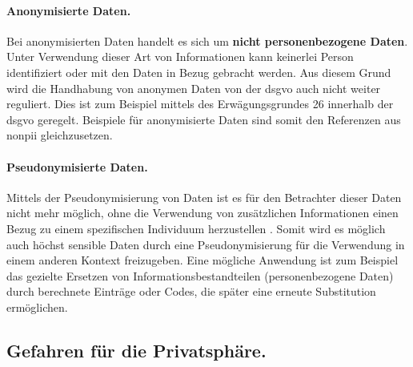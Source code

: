 \paragraph{Anonymisierte Daten.}
\label{sec:Grundlagen:para:Anonymisierte Daten}
Bei anonymisierten Daten handelt es sich um \textbf{nicht personenbezogene Daten}. Unter Verwendung dieser Art von Informationen kann keinerlei Person identifiziert oder mit den Daten in Bezug gebracht werden. Aus diesem Grund wird die Handhabung von anonymen Daten von der \ac{dsgvo} auch nicht weiter reguliert. Dies ist zum Beispiel mittels des Erwägungsgrundes 26 \cite{DSGVOEg26} innerhalb der \ac{dsgvo} geregelt. Beispiele für anonymisierte Daten sind somit den Referenzen aus \ac{nonpii} gleichzusetzen.


\paragraph{Pseudonymisierte Daten.}
\label{sec:Grundlagen:para:Pseudonymisierte Daten}
Mittels der Pseudonymisierung von Daten ist es für den Betrachter dieser Daten nicht mehr möglich, ohne die Verwendung von zusätzlichen Informationen einen Bezug zu einem spezifischen Individuum herzustellen \cite{DSGVOArt4}. Somit wird es möglich auch höchst sensible Daten durch eine Pseudonymisierung für die Verwendung in einem anderen Kontext freizugeben. Eine mögliche Anwendung ist zum Beispiel das gezielte Ersetzen von Informationsbestandteilen (personenbezogene Daten) durch berechnete Einträge oder Codes, die später eine erneute Substitution ermöglichen.

\subsection{Gefahren für die Privatsphäre.}
\label{sec:Grundlagen:ssec:Gefahren für die Privatsphäre}

